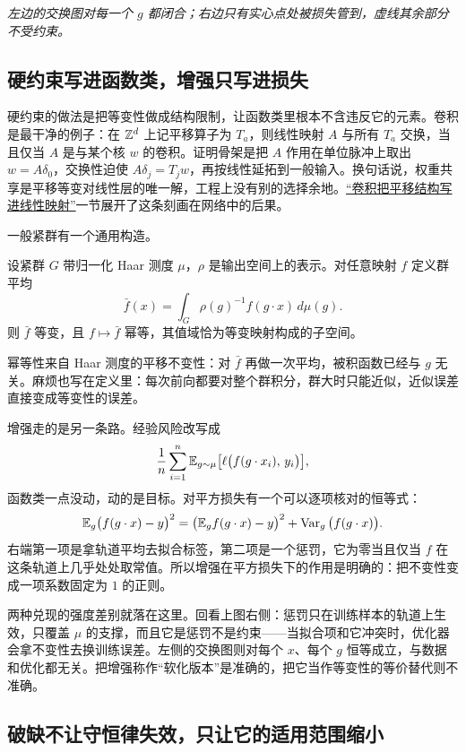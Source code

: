\emph{左边的交换图对每一个 \(g\) 都闭合；右边只有实心点处被损失管到，虚线其余部分不受约束。}

\subsection{硬约束写进函数类，增强只写进损失}

硬约束的做法是把等变性做成结构限制，让函数类里根本不含违反它的元素。卷积是最干净的例子：在 \(\mathbb{Z}^d\) 上记平移算子为 \(T_a\)，则线性映射 \(A\) 与所有 \(T_a\) 交换，当且仅当 \(A\) 是与某个核 \(w\) 的卷积。证明骨架是把 \(A\) 作用在单位脉冲上取出 \(w=A\delta_0\)，交换性迫使 \(A\delta_j=T_j w\)，再按线性延拓到一般输入。换句话说，权重共享是平移等变对线性层的唯一解，工程上没有别的选择余地。\hyperref[sec:14-Deep-Learning/04-Convolutional-Networks/01]{``卷积把平移结构写进线性映射''}一节展开了这条刻画在网络中的后果。

一般紧群有一个通用构造。

\begin{proposition}
设紧群 \(G\) 带归一化 Haar 测度 \(\mu\)，\(\rho\) 是输出空间上的表示。对任意映射 \(f\) 定义群平均
\[
\bar f(x)=\int_G \rho(g)^{-1} f(g\cdot x)\,d\mu(g).
\]
则 \(\bar f\) 等变，且 \(f\mapsto\bar f\) 幂等，其值域恰为等变映射构成的子空间。
\end{proposition}

幂等性来自 Haar 测度的平移不变性：对 \(\bar f\) 再做一次平均，被积函数已经与 \(g\) 无关。麻烦也写在定义里：每次前向都要对整个群积分，群大时只能近似，近似误差直接变成等变性的误差。

增强走的是另一条路。经验风险改写成
\[
\frac1n\sum_{i=1}^n \mathbb{E}_{g\sim\mu}\big[\ell\big(f(g\cdot x_i),\,y_i\big)\big],
\]
函数类一点没动，动的是目标。对平方损失有一个可以逐项核对的恒等式：
\[
\mathbb{E}_{g}\big(f(g\cdot x)-y\big)^2=\big(\mathbb{E}_{g}f(g\cdot x)-y\big)^2+\operatorname{Var}_{g}\big(f(g\cdot x)\big).
\]
右端第一项是拿轨道平均去拟合标签，第二项是一个惩罚，它为零当且仅当 \(f\) 在这条轨道上几乎处处取常值。所以增强在平方损失下的作用是明确的：把不变性变成一项系数固定为 \(1\) 的正则。

两种兑现的强度差别就落在这里。回看上图右侧：惩罚只在训练样本的轨道上生效，只覆盖 \(\mu\) 的支撑，而且它是惩罚不是约束——当拟合项和它冲突时，优化器会拿不变性去换训练误差。左侧的交换图则对每个 \(x\)、每个 \(g\) 恒等成立，与数据和优化都无关。把增强称作``软化版本''是准确的，把它当作等变性的等价替代则不准确。

\subsection{破缺不让守恒律失效，只让它的适用范围缩小}

